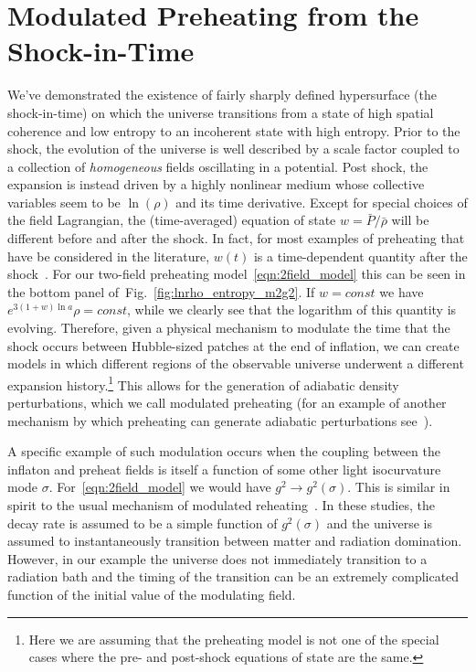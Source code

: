 \documentclass[11pt,a4paper]{article}
\newcommand{\figref}[1]{Fig.~\ref{#1}}
\begin{document}
\section{Modulated Preheating from the Shock-in-Time}
\label{sec:modulated_preheating}
We've demonstrated the existence of fairly sharply defined hypersurface (the shock-in-time) on which the universe transitions from a state of high spatial coherence and low entropy to an incoherent state with high entropy.
Prior to the shock, the evolution of the universe is well described by a scale factor coupled to a collection of \emph{homogeneous} fields oscillating in a potential.
Post shock, the expansion is instead driven by a highly nonlinear medium whose collective variables seem to be $\ln(\rho)$ and its time derivative.
Except for special choices of the field Lagrangian, the (time-averaged) equation of state $w=\bar{P}/\bar{\rho}$ will be different before and after the shock.
In fact, for most examples of preheating that have be considered in the literature, $w(t)$ is a time-dependent quantity after the shock~\cite{Podolsky:2005bw}.
For our two-field preheating model~\eqref{eqn:2field_model} this can be seen in the bottom panel of~\figref{fig:lnrho_entropy_m2g2}.
If $w=const$ we have $e^{3(1+w)\ln a}\rho = const$, while we clearly see that the logarithm of this quantity is evolving.
Therefore, given a physical mechanism to modulate the time that the shock occurs between Hubble-sized patches at the end of inflation, we can create models in which different regions of the observable universe underwent a different expansion history.\footnote{Here we are assuming that the preheating model is not one of the special cases where the pre- and post-shock equations of state are the same.}
This allows for the generation of adiabatic density perturbations, which we call modulated preheating (for an example of another mechanism by which preheating can generate adiabatic perturbations see~\cite{Bond:2009xx,Chambers:2007se,Chambers:2008gu,Kohri:2009ac}).

A specific example of such modulation occurs when the coupling between the inflaton and preheat fields is itself a function of some other light isocurvature mode $\sigma$.
For~\eqref{eqn:2field_model} we would have $g^2 \to g^2(\sigma)$.
This is similar in spirit to the usual mechanism of modulated reheating~\cite{Kofman:2003nx,Dvali:2003ar,Zaldarriaga:2003my,Dvali:2003em,Bernardeau:2004zz}.
In these studies, the decay rate is assumed to be a simple function of $g^2(\sigma)$ and the universe is assumed to instantaneously transition between matter and radiation domination.
However, in our example the universe does not immediately transition to a radiation bath and the timing of the transition can be an extremely complicated function of the initial value of the modulating field.
\end{document}
